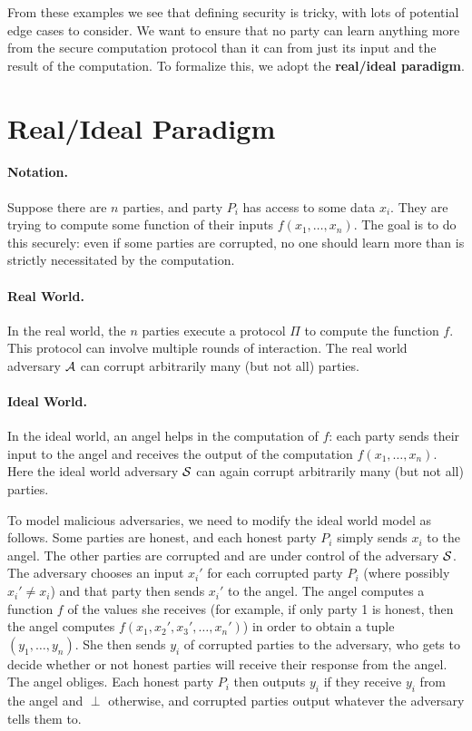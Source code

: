 From these examples we see that defining security is tricky, with lots of
potential edge cases to consider. We want to ensure that no party can learn
anything more from the secure computation protocol than it can from just its
input and the result of the computation. To formalize this, we adopt the
\textbf{real/ideal paradigm}.



\section{Real/Ideal Paradigm}
\paragraph{Notation.} 
Suppose there are $n$ parties, and party $P_i$ has access to some data $x_i$. They are trying to compute some function of their inputs $f(x_1, \dotsc, x_n)$. The goal is to do this securely: even if some parties are corrupted, no one should learn more than is strictly necessitated by the computation.

\paragraph{Real World.} In the real world, the $n$ parties execute a protocol $\Pi$
to compute the function $f$. This protocol can involve multiple rounds of
interaction. %
The real world adversary $\mathcal{A}$ can corrupt arbitrarily many (but not all) parties.


\paragraph{Ideal World.} In the ideal world, an angel helps in the
computation of $f$:
each party sends their input to the angel and receives the output of the computation $f(x_1, \dotsc, x_n)$.
Here the ideal world adversary $\mathcal{S}$ can again corrupt arbitrarily many (but not all) parties.

To model malicious adversaries, we need to modify the ideal world model as follows. 
Some parties are honest, and each honest party $P_i$ simply sends $x_i$ to the angel. The other parties are corrupted and are under control of the adversary $\mathcal{S}$. The adversary chooses an input $x_i'$ for each corrupted party $P_i$ (where possibly $x_i' \neq x_i$) and that party then sends $x_i'$ to the angel. The angel computes a function $f$ of the values she receives (for example, if only party 1 is honest, then the angel computes $f(x_1, x_2', x_3', \dotsc, x_n')$) in order to obtain a tuple $(y_1, \dotsc, y_n)$. 
She then sends $y_i$ of corrupted parties to the adversary, who gets to decide whether or not honest parties will receive their response from the angel. The angel obliges. Each honest party $P_i$ then outputs $y_i$ if they receive $y_i$ from the angel and $\perp$ otherwise, and corrupted parties output whatever the adversary tells them to. 

